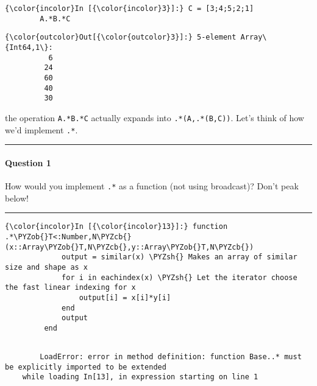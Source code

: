 \documentclass[11pt]{article}
\def\PYZob{\char`\{}
\def\PYZcb{\char`\}}
\def\PYZsh{\char`\#}
\begin{document}
    \begin{Verbatim}[commandchars=\\\{\}]
{\color{incolor}In [{\color{incolor}3}]:} C = [3;4;5;2;1]
        A.*B.*C
\end{Verbatim}

            \begin{Verbatim}[commandchars=\\\{\}]
{\color{outcolor}Out[{\color{outcolor}3}]:} 5-element Array\{Int64,1\}:
          6
         24
         60
         40
         30
\end{Verbatim}
        
    the operation \texttt{A.*B.*C} actually expands into
\texttt{.*(A,.*(B,C))}. Let's think of how we'd implement \texttt{.*}.

\begin{center}\rule{3in}{0.4pt}\end{center}

\paragraph{Question 1}\label{question-1}

How would you implement \texttt{.*} as a function (not using broadcast)?
Don't peak below!

\begin{center}\rule{3in}{0.4pt}\end{center}

    \begin{Verbatim}[commandchars=\\\{\}]
{\color{incolor}In [{\color{incolor}13}]:} function .*\PYZob{}T<:Number,N\PYZcb{}(x::Array\PYZob{}T,N\PYZcb{},y::Array\PYZob{}T,N\PYZcb{})
             output = similar(x) \PYZsh{} Makes an array of similar size and shape as x
             for i in eachindex(x) \PYZsh{} Let the iterator choose the fast linear indexing for x
                 output[i] = x[i]*y[i]
             end
             output
         end
\end{Verbatim}

    \begin{Verbatim}[commandchars=\\\{\}]

        LoadError: error in method definition: function Base..* must be explicitly imported to be extended
    while loading In[13], in expression starting on line 1

        

    \end{Verbatim}
\end{document}
